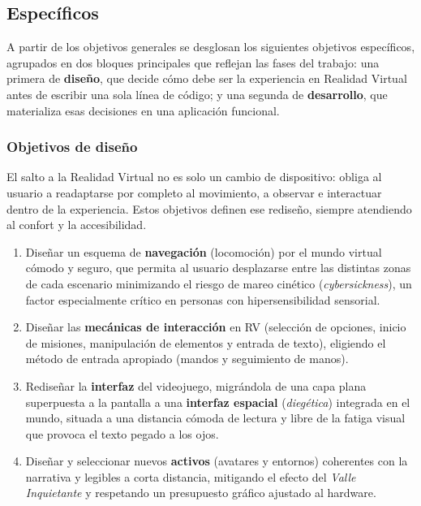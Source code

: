 \documentclass[12pt,twoside,titlepage]{report}
\begin{document}
\subsection{Específicos}

A partir de los objetivos generales se desglosan los siguientes objetivos específicos, agrupados en dos bloques principales que reflejan las fases del trabajo: una primera de \textbf{diseño}, que decide cómo debe ser la experiencia en Realidad Virtual antes de escribir una sola línea de código; y una segunda de \textbf{desarrollo}, que materializa esas decisiones en una aplicación funcional.

\subsubsection{Objetivos de diseño}

El salto a la Realidad Virtual no es solo un cambio de dispositivo: obliga al usuario a readaptarse por completo al movimiento, a observar e interactuar dentro de la experiencia.
Estos objetivos definen ese rediseño, siempre atendiendo al confort y la accesibilidad.

\begin{enumerate}[label=\textbf{\arabic*.}, leftmargin=1.5cm, itemsep=0.4em]
  \item Diseñar un esquema de \textbf{navegación} (locomoción) por el mundo virtual cómodo y seguro, que permita al usuario desplazarse entre las distintas zonas de cada escenario minimizando el riesgo de mareo cinético (\textit{cybersickness}), un factor especialmente crítico en personas con hipersensibilidad sensorial.
  \item Diseñar las \textbf{mecánicas de interacción} en RV (selección de opciones, inicio de misiones, manipulación de elementos y entrada de texto), eligiendo el método de entrada apropiado (mandos y seguimiento de manos).
  \item Rediseñar la \textbf{interfaz} del videojuego, migrándola de una capa plana superpuesta a la pantalla a una \textbf{interfaz espacial} (\textit{diegética}) integrada en el mundo, situada a una distancia cómoda de lectura y libre de la fatiga visual que provoca el texto pegado a los ojos.
  \item Diseñar y seleccionar nuevos \textbf{activos} (avatares y entornos) coherentes con la narrativa y legibles a corta distancia, mitigando el efecto del \textit{Valle Inquietante} y respetando un presupuesto gráfico ajustado al hardware.
\end{enumerate}
\end{document}
